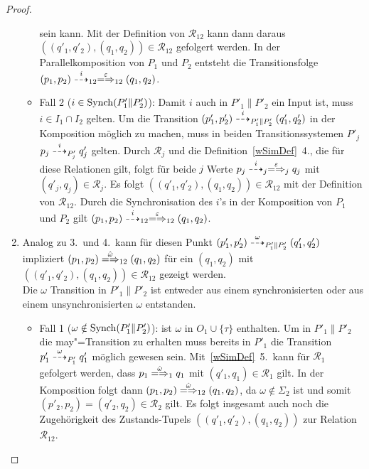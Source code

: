 \begin{proof}
\begin{enumerate}
\begin{itemize}
          sein kann. Mit der Definition von $\mathcal{R}_{12}$ kann dann daraus
          $((q'_1,q'_2),(q_1,q_2)) \in \mathcal{R}_{12}$ gefolgert werden. In
          der Parallelkomposition von $P_1$ und $P_2$ entsteht die
          Transitionsfolge $(p_1,p_2)\may[i]_{12} \weakmay[\varepsilon]_{12}
          (q_1,q_2)$.
        \item Fall 2 ($i\in\mathrm{Synch} (P'_1\|P'_2)$): Damit $i$ auch in
          $P'_1\|P'_2$ ein Input ist, muss $i\in I_1\cap I_2$ gelten. Um die
          Transition $(p'_1,p'_2)\may[i]_{P'_1\|P'_2}(q'_1,q'_2)$ in der
          Komposition möglich zu machen, muss in beiden Transitionssystemen
          $P'_j$ $p_j \may[i]_{P'_j} q'_j$ gelten. Durch $\mathcal{R}_j$ und
          die Definition~\ref{wSimDef}~4., die für diese Relationen gilt, folgt
          für beide $j$ Werte $p_j\may[i]_j \weakmay[\varepsilon]_j q_j$ mit
          $(q'_j,q_j)\in\mathcal{R}_j$. Es folgt $((q'_1,q'_2),(q_1,q_2)) \in
          \mathcal{R}_{12}$ mit der Definition von $\mathcal{R}_{12}$. Durch
          die Synchronisation des $i$'s in der Komposition von $P_1$ und $P_2$
          gilt $(p_1,p_2) \may[i]_{12} \weakmay[\varepsilon]_{12} (q_1,q_2)$.
      \end{itemize}
    \item Analog zu 3.\ und 4.\ kann für diesen Punkt $(p'_1,p'_2)
      \may[\omega]_{P'_1\|P'_2} (q'_1,q'_2)$ impliziert $(p_1,p_2)
      \weakmay[\hat{\omega}]_{12} (q_1,q_2)$ für ein $(q_1,q_2)$ mit
      $((q'_1,q'_2),(q_1,q_2))\in\mathcal{R}_{12}$ gezeigt werden.\\
      Die $\omega$ Transition in $P'_1\|P'_2$ ist entweder aus einem
      synchronisierten oder aus einem unsynchronisierten $\omega$ entstanden.
      \begin{itemize}
        \item Fall 1 ($\omega\notin\mathrm{Synch} (P'_1\|P'_2)$): \OBdA{} ist $\omega$
          in $O_1\cup\{\tau\}$ enthalten. Um in $P'_1\|P'_2$ die
          may"=Transition zu erhalten muss bereits in $P'_1$ die Transition
          $p'_1 \may[\omega]_{P'_1} q'_1$ möglich gewesen sein.
          Mit~\ref{wSimDef}~5.\ kann für $\mathcal{R}_1$ gefolgert werden, dass
          $p_1 \weakmay[\hat{\omega}]_1 q_1$ mit $(q'_1,q_1)\in\mathcal{R}_1$
          gilt. In der Komposition folgt dann $(p_1,p_2)
          \weakmay[\hat{\omega}]_{12} (q_1,q_2)$, da $\omega\notin \Sigma _2$
          ist und somit $(p'_2,p_2)=(q'_2,q_2)\in\mathcal{R}_2$ gilt. Es folgt
          insgesamt auch noch die Zugehörigkeit des Zustands-Tupels
          $((q'_1,q'_2),(q_1,q_2))$ zur Relation $\mathcal{R}_{12}$.

\end{itemize}
\end{enumerate}
\end{proof}
